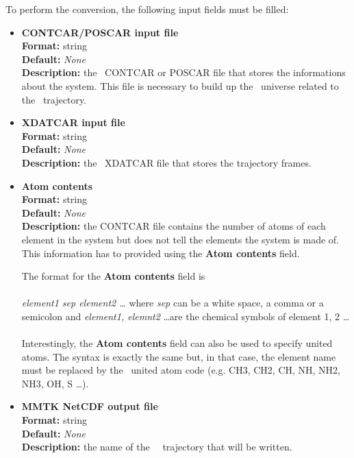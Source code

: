 \documentclass[a4paper,11pt]{report}
\begin{document}
To perform the conversion, the following input fields must be filled:
\begin{itemize}
\item \textbf{CONTCAR/POSCAR input file}\\
\textbf{Format:} string\\
\textbf{Default:} \textit{None}\\
\textbf{Description:} the \VASP\ CONTCAR or POSCAR file that stores the informations about the system. This file is 
necessary to build up the \MMTK\ universe related to the \MMTK\ trajectory.

\item \textbf{XDATCAR input file}\\
\textbf{Format:} string\\
\textbf{Default:} \textit{None}\\
\textbf{Description:} the \VASP\ XDATCAR file that stores the trajectory frames.

\item \textbf{Atom contents}\\
\textbf{Format:} string\\
\textbf{Default:} \textit{None}\\
\textbf{Description:} the CONTCAR file contains the number of atoms of each element in the system but does not tell the elements the system is 
made of. This information has to provided using the \textbf{Atom contents} field. 

The format for the \textbf{Atom contents} field is
\\\\
\textit{element1 sep element2 \ldots } where \textit{sep} can be a white space, a comma or a semicolon and 
\textit{element1, elemnt2} \ldots are the chemical symbols of element 1, 2 \ldots
\\\\
Interestingly, the \textbf{Atom contents} field can also be used to specify united atoms. The syntax is exactly the same but, in 
that case, the element name must be replaced by the \MMTK\ united atom code (e.g. CH3, CH2, CH, NH, NH2, NH3, OH, S \ldots ).

\item \textbf{MMTK NetCDF output file}\\
\textbf{Format:} string\\
\textbf{Default:} \textit{None}\\
\textbf{Description:} the name of the \MMTK\ \NetCDF\ trajectory that will be written.
\end{itemize}
\end{document}
